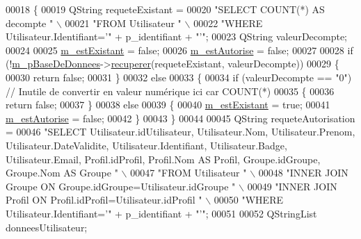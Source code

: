 \begin{DoxyCode}
00018 \{
00019     QString requeteExistant =
00020             \textcolor{stringliteral}{"SELECT COUNT(*) AS decompte "} \(\backslash\)
00021             \textcolor{stringliteral}{"FROM Utilisateur "} \(\backslash\)
00022             \textcolor{stringliteral}{"WHERE Utilisateur.Identifiant='"} + p\_identifiant + \textcolor{stringliteral}{"'"};
00023     QString valeurDecompte;
00024 
00025     \hyperlink{class_utilisateur_terminal_a6b16983fcb2b0f1f698f595309a67828}{m\_estExistant} = \textcolor{keyword}{false};
00026     \hyperlink{class_utilisateur_terminal_a79d15bdf8428eb1a131ce4801ac619aa}{m\_estAutorise} = \textcolor{keyword}{false};
00027 
00028     \textcolor{keywordflow}{if} (!\hyperlink{class_utilisateur_terminal_a93aefda4243fed6c1b74d78fa5fc954d}{m\_pBaseDeDonnees}->\hyperlink{class_base_de_donnees_a77539baad389f5acf754cd2cd452403e}{recuperer}(requeteExistant, valeurDecompte))
00029     \{
00030         \textcolor{keywordflow}{return} \textcolor{keyword}{false};
00031     \}
00032     \textcolor{keywordflow}{else}
00033     \{
00034         \textcolor{keywordflow}{if} (valeurDecompte == \textcolor{stringliteral}{"0"}) \textcolor{comment}{// Inutile de convertir en valeur numérique ici car COUNT(*)}
00035         \{
00036             \textcolor{keywordflow}{return} \textcolor{keyword}{false};
00037         \}
00038         \textcolor{keywordflow}{else}
00039         \{
00040             \hyperlink{class_utilisateur_terminal_a6b16983fcb2b0f1f698f595309a67828}{m\_estExistant} = \textcolor{keyword}{true};
00041             \hyperlink{class_utilisateur_terminal_a79d15bdf8428eb1a131ce4801ac619aa}{m\_estAutorise} = \textcolor{keyword}{false};
00042         \}
00043     \}
00044 
00045     QString requeteAutorisation =
00046             \textcolor{stringliteral}{"SELECT Utilisateur.idUtilisateur, Utilisateur.Nom, Utilisateur.Prenom,
       Utilisateur.DateValidite, Utilisateur.Identifiant, Utilisateur.Badge, Utilisateur.Email, Profil.idProfil, Profil.Nom AS Profil,
       Groupe.idGroupe, Groupe.Nom AS Groupe "} \(\backslash\)
00047             \textcolor{stringliteral}{"FROM Utilisateur "} \(\backslash\)
00048             \textcolor{stringliteral}{"INNER JOIN Groupe ON Groupe.idGroupe=Utilisateur.idGroupe "} \(\backslash\)
00049             \textcolor{stringliteral}{"INNER JOIN Profil ON Profil.idProfil=Utilisateur.idProfil "} \(\backslash\)
00050             \textcolor{stringliteral}{"WHERE Utilisateur.Identifiant='"} + p\_identifiant + \textcolor{stringliteral}{"'"};
00051 
00052     QStringList donneesUtilisateur;

\end{DoxyCode}
